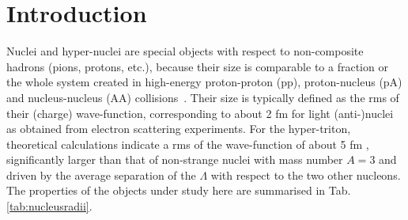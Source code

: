 \section{Introduction} 
Nuclei and hyper-nuclei are special objects with respect to non-composite hadrons (pions, protons, etc.), because their size is comparable to a fraction or the whole system created in high-energy proton-proton (pp), proton-nucleus (pA) and nucleus-nucleus (AA) collisions~\cite{Adam:2015vna}.  
Their size is typically defined as the rms of their (charge) wave-function, corresponding to about 2 fm for light (anti-)nuclei as obtained from electron scattering experiments. 
For the hyper-triton, theoretical calculations indicate a rms of the wave-function of about 5 fm \cite{Nemura:1999qp}, significantly larger than that of non-strange nuclei with mass number $A = 3$ and driven by the average separation of the $\Lambda$ with respect to the two other nucleons.
The properties of the objects under study here are summarised in Tab. \ref{tab:nucleusradii}.

